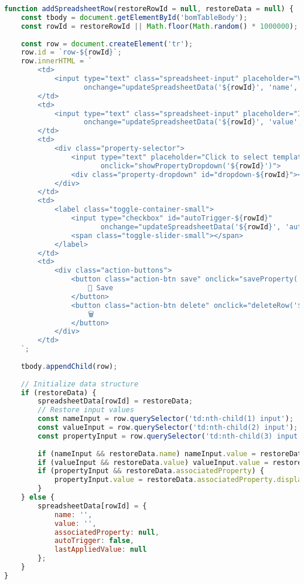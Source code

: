 \documentclass[12pt,a4paper]{article}
\begin{document}
\begin{lstlisting}[language=JavaScript, caption=Spreadsheet Row Management]
function addSpreadsheetRow(restoreRowId = null, restoreData = null) {
    const tbody = document.getElementById('bomTableBody');
    const rowId = restoreRowId || Math.floor(Math.random() * 1000000);
    
    const row = document.createElement('tr');
    row.id = `row-${rowId}`;
    row.innerHTML = `
        <td>
            <input type="text" class="spreadsheet-input" placeholder="Variable name" 
                   onchange="updateSpreadsheetData('${rowId}', 'name', this.value)">
        </td>
        <td>
            <input type="text" class="spreadsheet-input" placeholder="Input value" 
                   onchange="updateSpreadsheetData('${rowId}', 'value', this.value)">
        </td>
        <td>
            <div class="property-selector">
                <input type="text" placeholder="Click to select template property" readonly
                       onclick="showPropertyDropdown('${rowId}')">
                <div class="property-dropdown" id="dropdown-${rowId}"></div>
            </div>
        </td>
        <td>
            <label class="toggle-container-small">
                <input type="checkbox" id="autoTrigger-${rowId}" 
                       onchange="updateSpreadsheetData('${rowId}', 'autoTrigger', this.checked)">
                <span class="toggle-slider-small"></span>
            </label>
        </td>
        <td>
            <div class="action-buttons">
                <button class="action-btn save" onclick="saveProperty('${rowId}')">
                    💾 Save
                </button>
                <button class="action-btn delete" onclick="deleteRow('${rowId}')">
                    🗑️
                </button>
            </div>
        </td>
    `;
    
    tbody.appendChild(row);
    
    // Initialize data structure
    if (restoreData) {
        spreadsheetData[rowId] = restoreData;
        // Restore input values
        const nameInput = row.querySelector('td:nth-child(1) input');
        const valueInput = row.querySelector('td:nth-child(2) input');
        const propertyInput = row.querySelector('td:nth-child(3) input');
        
        if (nameInput && restoreData.name) nameInput.value = restoreData.name;
        if (valueInput && restoreData.value) valueInput.value = restoreData.value;
        if (propertyInput && restoreData.associatedProperty) {
            propertyInput.value = restoreData.associatedProperty.displayName;
        }
    } else {
        spreadsheetData[rowId] = {
            name: '',
            value: '',
            associatedProperty: null,
            autoTrigger: false,
            lastAppliedValue: null
        };
    }
}
\end{lstlisting}
\end{document}
